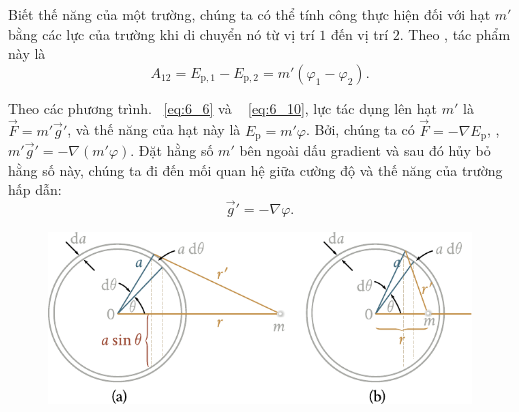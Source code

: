 Biết thế năng của một trường, chúng ta có thể tính công thực hiện đối với hạt $m'$ bằng các lực của trường khi di chuyển nó từ vị trí $1$ đến vị trí $2$. Theo , tác phẩm này là
\begin{equation}\label{eq:6_11}
	A_{12} = E_{\text{p},1} - E_{\text{p},2} = m'(\varphi_1 - \varphi_2).
\end{equation}

Theo các phương trình. ~\eqref{eq:6_6} và ~ \eqref{eq:6_10}, lực tác dụng lên hạt $m'$ là $\vec{F}=m'\vec{g}'$, và thế năng của hạt này là $E_{\text{p}}=m'\varphi$. Bởi, chúng ta có $\vec{F}=-\nabla E_{\text{p}}$, \ie, $m'\vec{g}'=-\nabla(m'\varphi)$. Đặt hằng số $m'$ bên ngoài dấu gradient và sau đó hủy bỏ hằng số này, chúng ta đi đến mối quan hệ giữa cường độ và thế năng của trường hấp dẫn:
\begin{equation}\label{eq:6_12}
	\vec{g}' = -\nabla\varphi.
\end{equation}

\begin{figure}[!htb]
	\begin{center}
		\includegraphics[scale=0.95]{figures/ch_06/fig_6_4.pdf}
		\caption[]{}
		\label{fig:6_4}
	\end{center}
\end{figure}

